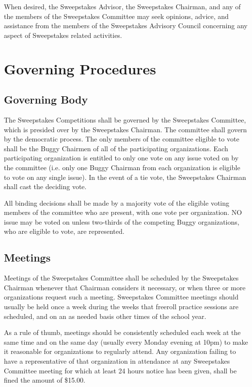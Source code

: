 	When desired, the Sweepstakes Advisor, the Sweepstakes Chairman, and any of the members of the Sweepstakes Committee may seek opinions, advice, and assistance from the members of the Sweepstakes Advisory Council concerning any aspect of Sweepstakes related activities.

\section{Governing Procedures}

\subsection{Governing Body}

	The Sweepstakes Competitions shall be governed by the Sweepstakes Committee, which is presided over by the Sweepstakes Chairman. The committee shall govern by the democratic process. The only members of the committee eligible to vote shall be the Buggy Chairmen of all of the participating organizations. Each participating organization is entitled to only one vote on any issue voted on by the committee (i.e. only one Buggy Chairman from each organization is eligible to vote on any single issue). In the event of a tie vote, the Sweepstakes Chairman shall cast the deciding vote.

	All binding decisions shall be made by a majority vote of the eligible voting members of the committee who are present, with one vote per organization. NO issue may be voted on unless two-thirds of the competing Buggy organizations, who are eligible to vote, are represented.

\subsection{Meetings}
\label{subsec:Meetings}

	Meetings of the Sweepstakes Committee shall be scheduled by the Sweepstakes Chairman whenever that Chairman considers it necessary, or when three or more organizations request such a meeting. Sweepstakes Committee meetings should usually be held once a week during the weeks that freeroll practice sessions are scheduled, and on an as needed basis other times of the school year.

	As a rule of thumb, meetings should be consistently scheduled each week at the same time and on the same day (usually every Monday evening at 10pm) to make it reasonable for organizations to regularly attend. Any organization failing to have a representative of that organization in attendance at any Sweepstakes Committee meeting for which at least 24 hours notice has been given, shall be fined the amount of \$15.00.

